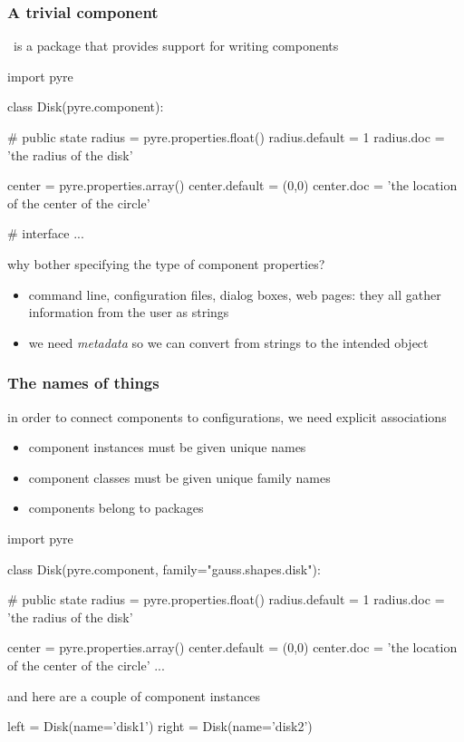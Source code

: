 \begin{frame}[fragile]
%
  \frametitle{A trivial component}
%
  \pyre\ is a package that provides support for writing components
%
  \begin{ipython}{}
import pyre

class Disk(pyre.component):

    # public state
    radius = pyre.properties.float()
    radius.default = 1
    radius.doc = 'the radius of the disk'

    center = pyre.properties.array()
    center.default = (0,0)
    center.doc = 'the location of the center of the circle'

    # interface
    ...
  \end{ipython}
%
  why bother specifying the type of component properties?
  \begin{itemize}
  \item command line, configuration files, dialog boxes, web pages: they all gather information
    from the user as strings
  \item we need \emph{metadata} so we can convert from strings to the intended object
  \end{itemize}
%
\end{frame}

\begin{frame}[fragile]
%
  \frametitle{The names of things}
%
  in order to connect components to configurations, we need explicit associations
  \begin{itemize}
  \item component instances must be given unique names
  \item component classes must be given unique family names
  \item components belong to packages
  \end{itemize}
%
  \begin{ipython}{}
import pyre

class Disk(pyre.component, family="gauss.shapes.disk"):

    # public state
    radius = pyre.properties.float()
    radius.default = 1
    radius.doc = 'the radius of the disk'

    center = pyre.properties.array()
    center.default = (0,0)
    center.doc = 'the location of the center of the circle'
    ...
  \end{ipython}
%
  and here are a couple of component instances
%
  \begin{ipython}{}
left = Disk(name='disk1')
right = Disk(name='disk2')
  \end{ipython}
\end{frame}

